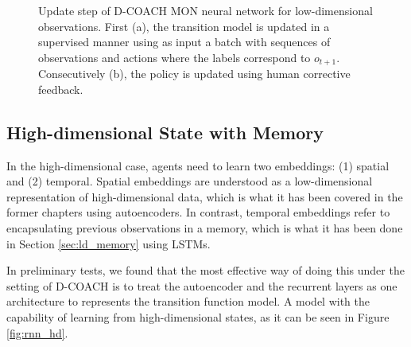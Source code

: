\begin{figure}[h]
\centering
{}
\caption[Update step of D-COACH MON neural network for low-dimensional observations.]{Update step of D-COACH MON neural network for low-dimensional observations. First (a), the transition model is updated in a supervised manner using as input a batch with sequences of observations and actions where the labels correspond to $o_{t+1}$. Consecutively (b), the policy is updated using human corrective feedback.} 
\label{fig:ld_mon_train} 
\end{figure}

\subsection{High-dimensional State with Memory}
In the high-dimensional case, agents need to learn two embeddings: (1) spatial and (2) temporal. Spatial embeddings are understood as a low-dimensional representation of high-dimensional data, which is what it has been covered in the former chapters using autoencoders. In contrast, temporal embeddings refer to encapsulating previous observations in a memory, which is what it has been done in Section \ref{sec:ld_memory} using LSTMs. 

In preliminary tests, we found that the most effective way of doing this under the setting of D-COACH is to treat the autoencoder and the recurrent layers as one architecture to represents the transition function model. A model with the capability of learning from high-dimensional states, as it can be seen in Figure \ref{fig:rnn_hd}. 

